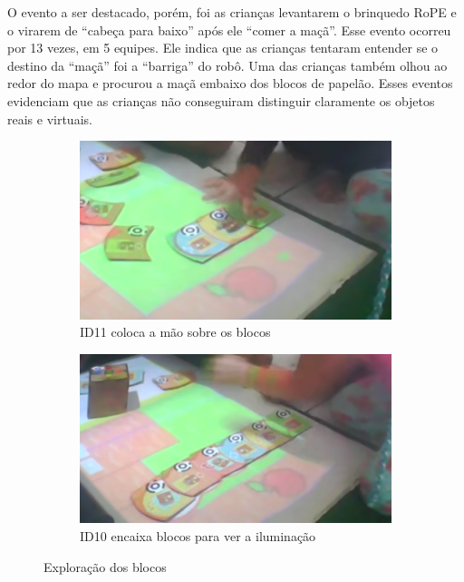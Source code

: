 O evento a ser destacado, porém, foi as crianças levantarem o brinquedo RoPE e o virarem de “cabeça para baixo” após ele “comer a maçã”. Esse evento ocorreu por 13 vezes, em 5 equipes. Ele indica que as crianças tentaram entender se o destino da “maçã” foi a “barriga” do robô. Uma das crianças também olhou ao redor do mapa e procurou a maçã embaixo dos blocos de papelão. Esses eventos evidenciam que as crianças não conseguiram distinguir claramente os objetos reais e virtuais. 

\begin{figure}[!htbp]
    \centering
    \begin{subfigure}{.5\textwidth}
        \centering
        \includegraphics[width=.9\linewidth,fbox]{figs/percepcao_ra/mao_sobre_blocos.png}
        \caption{ID11 coloca a mão sobre os blocos}
        \label{fig:mao_sobre_blocos}
    \end{subfigure}%
    \begin{subfigure}{.5\textwidth}
        \centering
        \includegraphics[width=.9\linewidth,fbox]{figs/percepcao_ra/sequencia_blocos.png}
        \caption{ID10 encaixa blocos para ver a iluminação}
        \label{fig:sequencia_blocos}
    \end{subfigure}
    \caption{Exploração dos blocos}
    \label{fig:percepcoes_ra}
\end{figure}

